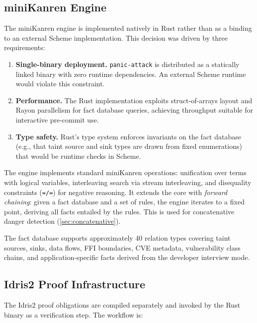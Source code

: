 \documentclass[11pt,twocolumn]{article}
\begin{document}
\subsection{miniKanren Engine}

The miniKanren engine is implemented natively in Rust rather than as
a binding to an external Scheme implementation. This decision was driven
by three requirements:

\begin{enumerate}[nosep]
  \item \textbf{Single-binary deployment.} \texttt{panic-attack} is
    distributed as a statically linked binary with zero runtime
    dependencies. An external Scheme runtime would violate this
    constraint.
  \item \textbf{Performance.} The Rust implementation exploits
    struct-of-arrays layout and Rayon parallelism for fact database
    queries, achieving throughput suitable for interactive pre-commit
    use.
  \item \textbf{Type safety.} Rust's type system enforces invariants
    on the fact database (e.g., that taint source and sink types are
    drawn from fixed enumerations) that would be runtime checks in
    Scheme.
\end{enumerate}

The engine implements standard miniKanren operations: unification
over terms with logical variables, interleaving search via stream
interleaving, and disequality constraints (\texttt{=/=}) for negative
reasoning. It extends the core with \emph{forward chaining}: given a
fact database and a set of rules, the engine iterates to a fixed point,
deriving all facts entailed by the rules. This is used for concatenative
danger detection (\cref{sec:concatenative}).

The fact database supports approximately 40 relation types covering
taint sources, sinks, data flows, FFI boundaries, CVE metadata,
vulnerability class chains, and application-specific facts derived
from the developer interview mode.

\subsection{Idris2 Proof Infrastructure}

The Idris2 proof obligations are compiled separately and invoked by
the Rust binary as a verification step. The workflow is:
\end{document}
